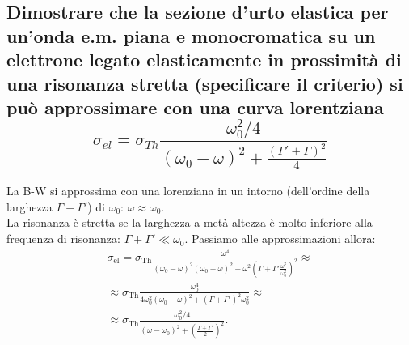 \subsection[\hspace{2mm} Approssimare la Brieght-Wiegner con una Lorentziana]{Dimostrare che la sezione d’urto elastica per un’onda e.m. piana e monocromatica su un elettrone legato elasticamente in prossimità di una risonanza stretta (specificare il criterio) si può approssimare con una curva lorentziana
\[
	\sigma_{el} = \sigma_{Th} \frac{\omega_{0}^2 / 4}{ \left( \omega_0 - \omega \right)^2 + \frac{ \left( \Gamma' + \Gamma  \right)^2 }{4} }
\] 
}
La B-W si approssima con una lorenziana in un intorno (dell'ordine della larghezza $\Gamma + \Gamma'$) di $\omega_0$: $\omega \approx \omega_0$.\\
La risonanza è stretta se la larghezza a metà altezza è molto inferiore alla frequenza di risonanza: $\Gamma + \Gamma' \ll \omega_0$.
Passiamo alle approssimazioni allora:
\begin{align*}
	\sigma_{\text{el}} = \sigma_{\text{Th}}\frac{\omega ^{4}}{\left( \omega _0 - \omega\right)^2 \left( \omega_0 + \omega \right)^2 + \omega^2\left( \Gamma + \Gamma' \frac{\omega^2}{\omega_0^2} \right)^2} \approx \\
	\approx \sigma_{\text{Th}} \frac{\omega _0^4}{4 \omega _0^2 \left( \omega _0 - \omega  \right)^2 + \left( \Gamma + \Gamma' \right)^2 \omega _0^2  } \approx \\
	\approx \sigma_{\text{Th}}\frac{\omega_0^2/4}{\left( \omega - \omega_0 \right)^2 + \left(\frac{\Gamma + \Gamma'}{2}\right)^2 }
.\end{align*}

